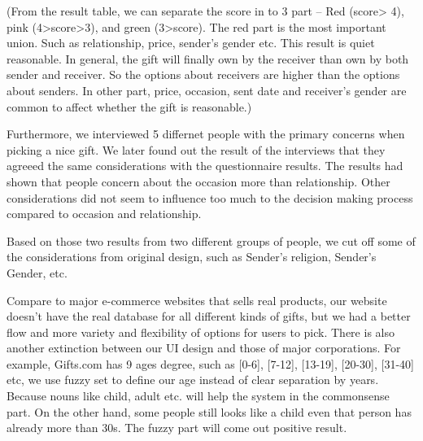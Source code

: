 \documentclass[11pt,twocolumn]{article}
\begin{document}
(From the result table, we can separate the score in to 3 part – Red (score> 4), pink (4>score>3), and green (3>score).  The red part is the most important union.  Such as relationship, price, sender’s gender etc. This result is quiet reasonable.   In general, the gift will finally own by the receiver than own by both sender and receiver.   So the options about receivers are higher than the options about senders.  In other part, price, occasion, sent date and receiver’s gender are common to affect whether the gift is reasonable.)

Furthermore, we interviewed 5 differnet people with the primary concerns when picking a nice gift. We later found out the result of the interviews that they agreeed the same considerations with the questionnaire results. The results had shown that people  concern about the occasion more than relationship.  Other considerations did not seem to influence too much to the decision making process compared to occasion and relationship.

Based on those two results from two different groups of people, we cut off some of the considerations from original design, such as Sender's religion, Sender's Gender, etc.




Compare to major e-commerce websites that sells real products, our website doesn't have the real database for all different kinds of gifts, but we had a better flow and more variety and flexibility of options for users to pick. There is also another extinction between our UI design and those of major corporations. For example, Gifts.com has 9 ages degree, such as [0-6], [7-12], [13-19], [20-30], [31-40] etc, we use fuzzy set to define our age instead of clear separation by years. Because nouns like child, adult etc. will help the system in the commonsense part.  On the other hand, some people still looks like a child even that person has already more than 30s.  The fuzzy part will come out positive result.
\end{document}
